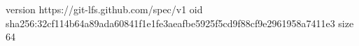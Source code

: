 version https://git-lfs.github.com/spec/v1
oid sha256:32cf114b64a89ada60841f1e1fe3aeafbe5925f5cd9f88cf9e2961958a7411e3
size 64
